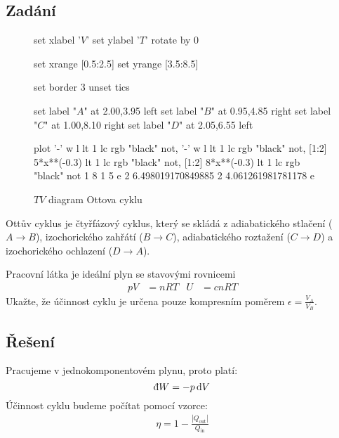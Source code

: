 \documentclass{article}
\def\vph{\vphantom}
\newcommand{\const}[1]{\text{#1}}
\renewcommand{\d}[1]{\const{d} #1}
\newcommand{\di}[1]{\mathchar22\mkern-11mu \mathrm{d} #1}
\begin{document}
\subsection*{Zadání}
\vph{.} \vspace{-\baselineskip}
\begin{wrapfigure}{r}{6cm}
    \vspace{-5\baselineskip}
    \centering
    \begin{gnuplot}[terminal=cairolatex, terminaloptions = {size 5cm, 5cm}]
    	set xlabel '$V$'
    	set ylabel '$T$' rotate by 0
    	
    	set xrange [0.5:2.5]
    	set yrange [3.5:8.5]
    	
    	set border 3
    	unset tics
    	
    	set label "$A$" at 2.00,3.95 left
    	set label "$B$" at 0.95,4.85 right
    	set label "$C$" at 1.00,8.10 right
    	set label "$D$" at 2.05,6.55 left
    	
    	plot '-' w l lt 1 lc rgb "black" not, '-' w l lt 1 lc rgb "black" not, [1:2] 5*x**(-0.3) lt 1 lc rgb "black" not, [1:2] 8*x**(-0.3) lt 1 lc rgb "black" not
    	1 8
    	1 5
    	e
    	2 6.498019170849885
    	2 4.061261981781178
    	e
    \end{gnuplot}
    \caption{$TV$ diagram Ottova cyklu}
\end{wrapfigure}
Ottův cyklus je čtyřfázový cyklus, který se skládá z adiabatického stlačení ($A\to B$), izochorického zahřátí ($B\to C$), adiabatického roztažení (${C\to D}$) a izochorického ochlazení ($D\to A$).

Pracovní látka je ideální plyn se stavovými rovnicemi
\begin{align*}
    pV &= nRT & U &= cnRT
\end{align*}
Ukažte, že účinnost cyklu je určena pouze kompresním poměrem $\epsilon = \frac{V_A}{V_B}$.

\subsection*{Řešení}
Pracujeme v jednokomponentovém plynu, proto platí:
\begin{equation*}
    \di{W} = -p \, \d{V}
\end{equation*}
Účinnost cyklu budeme počítat pomocí vzorce:
\begin{align*}
    \eta = 1 - \frac{|Q_\const{out}|}{Q_\const{in}}
\end{align*}
\end{document}
